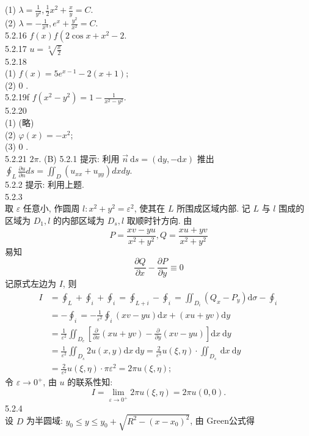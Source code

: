 \documentclass[a4paper,11pt,UTF8]{article}
\begin{document}
(1) $\lambda=\frac{1}{y^2}, \frac{1}{2} x^2+\frac{x}{y}=C$.\\
(2) $\lambda=-\frac{1}{x^4}, e^x+\frac{y^2}{x^2}=C$.\\
5.2.16 $f(x) f\left(2 \cos x+x^2-2\right.$.\\
5.2.17 $u=\sqrt[3]{\frac{x}{2}}$\\
5.2.18\\
(1) $f(x)=5 e^{x-1}-2(x+1)$;\\
(2) 0 .\\
5.2.19f $f\left(x^2-y^2\right)=1-\frac{1}{x^2-y^2}$.\\
5.2.20\\
(1) (略)\\
(2) $\varphi(x)=-x^2$;\\
(3) 0 .\\
5.2.21 $2 \pi$.
(B)
5.2.1 提示: 利用 $\vec{n} \mathrm{~d} s=(\mathrm{d} y,-\mathrm{d} x)$ 推出 $\oint_L \frac{\partial u}{\partial n} d s=\iint_D\left(u_{x x}+u_{y y}\right) d x d y$.\\
5.2.2 提示: 利用上题.\\
5.2.3\\
取 $\varepsilon$ 任意小, 作圆周 $l: x^2+y^2=\varepsilon^2$, 使其在 $L$ 所围成区域内部. 记 $L$ 与 $l$ 围成的 区域为 $D_1, l$ 的内部区域为 $D_s, l$ 取顺时针方向. 由
$$
P=\frac{x v-y u}{x^2+y^2}, Q=\frac{x u+y v}{x^2+y^2}
$$
易知
$$
\frac{\partial Q}{\partial x}-\frac{\partial P}{\partial y} \equiv 0
$$
记原式左边为 $I$, 则
$$
\begin{aligned}
	I & =\oint_L+\oint_i+\oint_i=\oint_{L+i}-\oint_i=\iint_{D_i}\left(Q_x-P_y\right) \mathrm{d} \sigma-\oint_i \\
	& =-\oint_i=-\frac{1}{\varepsilon^2} \oint_i(x v-y u) \mathrm{d} x+(x u+y v) \mathrm{d} y \\
	& =\frac{1}{\varepsilon^2} \iint_{D_e}\left[\frac{\partial}{\partial x}(x u+y v)-\frac{\partial}{\partial y}(x v-y u)\right] \mathrm{d} x \mathrm{~d} y \\
	& =\frac{1}{\varepsilon^2} \iint_{D_s} 2 u(x, y) \mathrm{d} x \mathrm{~d} y=\frac{2}{\varepsilon^2} u(\xi, \eta) \cdot \iint_{D_s} \mathrm{~d} x \mathrm{~d} y \\
	& =\frac{2}{\varepsilon^2} u(\xi, \eta) \cdot \pi \varepsilon^2=2 \pi u(\xi, \eta) ;
\end{aligned}
$$
令 $\varepsilon \rightarrow 0^{+}$, 由 $u$ 的联系性知:
$$
I=\lim _{\varepsilon \rightarrow 0^{+}} 2 \pi u(\xi, \eta)=2 \pi u(0,0) .
$$
5.2.4\\
 设 $D$ 为半圆域: $y_0 \leq y \leq y_0+\sqrt{R^2-\left(x-x_0\right)^2}$, 由 Green公式得
\end{document}
